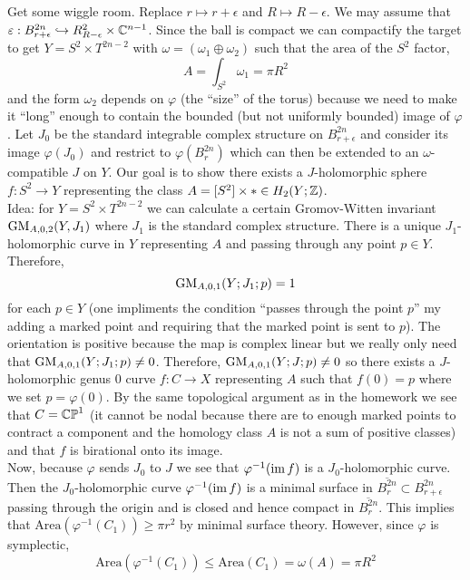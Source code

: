 \documentclass[12pt]{article}
\begin{document}
Get some wiggle room. Replace $r \mapsto r + \epsilon$ and $R \mapsto R - \epsilon$. We may assume that $\varepsilon : B^{2n}_{r + \epsilon} \hookrightarrow R^2_{R - \epsilon} \times \mathbb{C}^{n-1}$. Since the ball is compact we can compactify the target to get $Y = S^2 \times T^{2n - 2}$ with $\omega = (\omega_1 \oplus \omega_2)$ such that the area of the $S^2$ factor,
\[ A = \int_{S^2} \omega_1 = \pi R^2 \]
and the form $\omega_2$ depends on $\varphi$ (the ``size'' of the torus) because we need to make it ``long'' enough to contain the bounded (but not uniformly bounded) image of $\varphi$. Let $J_0$ be the standard integrable complex structure on $B^{2n}_{r+\epsilon}$ and consider its image $\varphi(J_0)$ and restrict to $\varphi(B^{2n}_{r})$ which can then be extended to an $\omega$-compatible $J$ on $Y$. Our goal is to show there exists a $J$-holomorphic sphere $f : S^2 \to Y$ representing the class $A = [S^2] \times * \in H_2(Y; \mathbb{Z})$. 
\bigskip\\
Idea: for $Y = S^2 \times T^{2n-2}$ we can calculate a certain Gromov-Witten invariant $\mathrm{GM}_{A,0,2}(Y, J_1)$ where $J_1$ is the standard complex structure. There is a unique $J_1$-holomorphic curve in $Y$ representing $A$ and passing through any point $p \in Y$. Therefore,
\[ \mathrm{GM}_{A,0,1}(Y; J_1; p) = 1 \]
for each $p \in Y$ (one impliments the condition ``passes through the point $p$'' my adding a marked point and requiring that the marked point is sent to $p$). The orientation is positive because the map is complex linear but we really only need that $\mathrm{GM}_{A,0,1}(Y ; J_1; p) \neq 0$. Therefore, $\mathrm{GM}_{A,0,1}(Y; J; p) \neq 0$ so there exists a $J$-holomorphic genus $0$ curve $f : C \to X$ representing $A$ such that $f(0) = p$ where we set $p = \varphi(0)$. By the same topological argument as in the homework we see that $C = \mathbb{CP}^1$ (it cannot be nodal because there are to enough marked points to contract a component and the homology class $A$ is not a sum of positive classes) and that $f$ is birational onto its image. 
\bigskip\\
Now, because $\varphi$ sends $J_0$ to $J$ we see that $\varphi^{-1}(\operatorname{\mathrm{im}}{f})$ is a $J_0$-holomorphic curve. Then the $J_0$-holomorphic curve $\varphi^{-1}(\operatorname{\mathrm{im}} f)$ is a minimal surface in $\overline{B^{2n}_r} \subset B^{2n}_{r + \epsilon}$ passing through the origin and is closed and hence compact in $\overline{B^{2n}_r}$. This implies that $\mathrm{Area}(\varphi^{-1}(C_1)) \ge \pi r^2$ by minimal surface theory. However, since $\varphi$ is symplectic,
\[ \mathrm{Area}(\varphi^{-1}(C_1)) \le \mathrm{Area}(C_1) = \omega(A) = \pi R^2 \]
\end{document}
